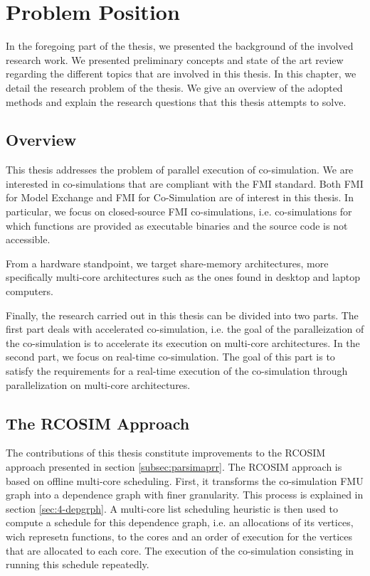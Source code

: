\chapter{\label{ch:3-state}Problem Position} 

\minitoc

In the foregoing part of the thesis, we presented the background of the involved research work. We presented preliminary concepts and state of the art review regarding the different topics that are involved in this thesis. In this chapter, we detail the research problem of the thesis. We give an overview of the adopted methods and explain the research questions that this thesis attempts to solve.

\section{Overview}

This thesis addresses the problem of parallel execution of co-simulation. We are interested in co-simulations that are compliant with the FMI standard. Both FMI for Model Exchange and FMI for Co-Simulation are of interest in this thesis. In particular, we focus on closed-source FMI co-simulations, i.e. co-simulations for which functions are provided as executable binaries and the source code is not accessible.

From a hardware standpoint, we target share-memory architectures, more specifically multi-core architectures such as the ones found in desktop and laptop computers.

Finally, the research carried out in this thesis can be divided into two parts. The first part deals with accelerated co-simulation, i.e. the goal of the paralleization of the co-simulation is to accelerate its execution on multi-core architectures. In the second part, we focus on real-time co-simulation. The goal of this part is to satisfy the requirements for a real-time execution of the co-simulation through parallelization on multi-core architectures.

\section{The RCOSIM Approach}

The contributions of this thesis constitute improvements to the RCOSIM approach presented in section \ref{subsec:parsimaprr}. The RCOSIM approach is based on offline multi-core scheduling. First, it transforms the co-simulation FMU graph into a dependence graph with finer granularity. This process is explained in section \ref{sec:4-depgrph}. A multi-core list scheduling heuristic is then used to compute a schedule for this dependence graph, i.e. an allocations of its vertices, wich represetn functions, to the cores and an order of execution for the vertices that are allocated to each core. The execution of the co-simulation consisting in running this schedule repeatedly.

